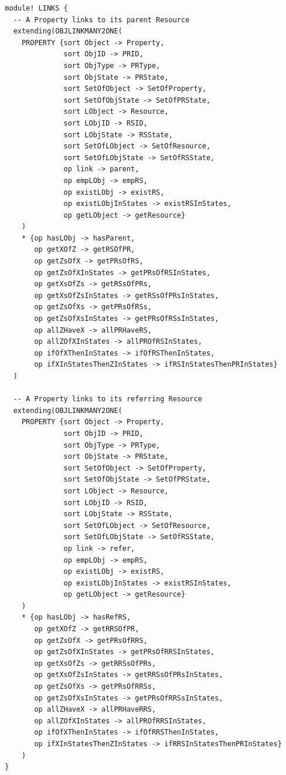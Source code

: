 \documentclass[12pt]{report}
\begin{document}
\begin{verbatim}
  module! LINKS {
    -- A Property links to its parent Resource
    extending(OBJLINKMANY2ONE(
      PROPERTY {sort Object -> Property,
                sort ObjID -> PRID,
                sort ObjType -> PRType,
                sort ObjState -> PRState,
                sort SetOfObject -> SetOfProperty,
                sort SetOfObjState -> SetOfPRState,
                sort LObject -> Resource,
                sort LObjID -> RSID,
                sort LObjState -> RSState,
                sort SetOfLObject -> SetOfResource,
                sort SetOfLObjState -> SetOfRSState,
                op link -> parent,
                op empLObj -> empRS,
                op existLObj -> existRS,
                op existLObjInStates -> existRSInStates,
                op getLObject -> getResource}
      )
      * {op hasLObj -> hasParent,
         op getXOfZ -> getRSOfPR,
         op getZsOfX -> getPRsOfRS,
         op getZsOfXInStates -> getPRsOfRSInStates,
         op getXsOfZs -> getRSsOfPRs,
         op getXsOfZsInStates -> getRSsOfPRsInStates,
         op getZsOfXs -> getPRsOfRSs,
         op getZsOfXsInStates -> getPRsOfRSsInStates,
         op allZHaveX -> allPRHaveRS,
         op allZOfXInStates -> allPROfRSInStates,
         op ifOfXThenInStates -> ifOfRSThenInStates,
         op ifXInStatesThenZInStates -> ifRSInStatesThenPRInStates}
    )
  
    -- A Property links to its referring Resource
    extending(OBJLINKMANY2ONE(
      PROPERTY {sort Object -> Property,
                sort ObjID -> PRID,
                sort ObjType -> PRType,
                sort ObjState -> PRState,
                sort SetOfObject -> SetOfProperty,
                sort SetOfObjState -> SetOfPRState,
                sort LObject -> Resource,
                sort LObjID -> RSID,
                sort LObjState -> RSState,
                sort SetOfLObject -> SetOfResource,
                sort SetOfLObjState -> SetOfRSState,
                op link -> refer,
                op empLObj -> empRS,
                op existLObj -> existRS,
                op existLObjInStates -> existRSInStates,
                op getLObject -> getResource}
      )
      * {op hasLObj -> hasRefRS,
         op getXOfZ -> getRRSOfPR,
         op getZsOfX -> getPRsOfRRS,
         op getZsOfXInStates -> getPRsOfRRSInStates,
         op getXsOfZs -> getRRSsOfPRs,
         op getXsOfZsInStates -> getRRSsOfPRsInStates,
         op getZsOfXs -> getPRsOfRRSs,
         op getZsOfXsInStates -> getPRsOfRRSsInStates,
         op allZHaveX -> allPRHaveRRS,
         op allZOfXInStates -> allPROfRRSInStates,
         op ifOfXThenInStates -> ifOfRRSThenInStates,
         op ifXInStatesThenZInStates -> ifRRSInStatesThenPRInStates}
      )
  }
\end{verbatim}
\end{document}
